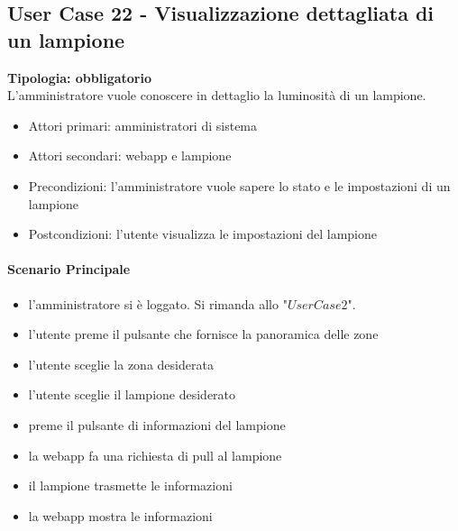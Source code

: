 \documentclass[12pt]{article}
\begin{document}
\subsection{User Case 22 - Visualizzazione dettagliata di un lampione}
\textbf{Tipologia: obbligatorio} \\
L'amministratore vuole conoscere in dettaglio la luminosità di un lampione.
\begin{itemize}
	\item Attori primari: amministratori di sistema
	\item Attori secondari: webapp e lampione
	\item Precondizioni: l'amministratore vuole sapere lo stato e le impostazioni di un lampione
	\item Postcondizioni: l'utente visualizza le impostazioni del lampione
\end{itemize}
\paragraph{Scenario Principale}
\begin{itemize}
	\item l'amministratore si è loggato. Si rimanda allo "$User Case 2$".
	\item l'utente preme il pulsante che fornisce la panoramica delle zone
	\item l'utente sceglie la zona desiderata
	\item l'utente sceglie il lampione desiderato
	\item preme il pulsante di informazioni del lampione
	\item la webapp fa una richiesta di pull al lampione
	\item il lampione trasmette le informazioni
	\item la webapp mostra le informazioni
\end{itemize}
\end{document}
